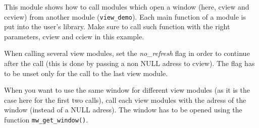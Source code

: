 This module shows how to call modules which open a window (here, cview and ccview) from another module (\verb+view_demo+).
Each main function of a module is put into the user's library. 
Make sure to call such function with the right parameters, cview and cciew in 
this example.

When calling several view modules, set the {\em no\_refresh} flag in order to continue 
after the call (this is done by passing a non NULL adress to cview). The flag has
to be unset only for the call to the last view module.

When you want to use the same window for different view modules (as it is the case here
for the first two calls), call each view modules with the adress of the window (instead of a NULL adress). The window has to be opened using the function \verb+mw_get_window()+.

